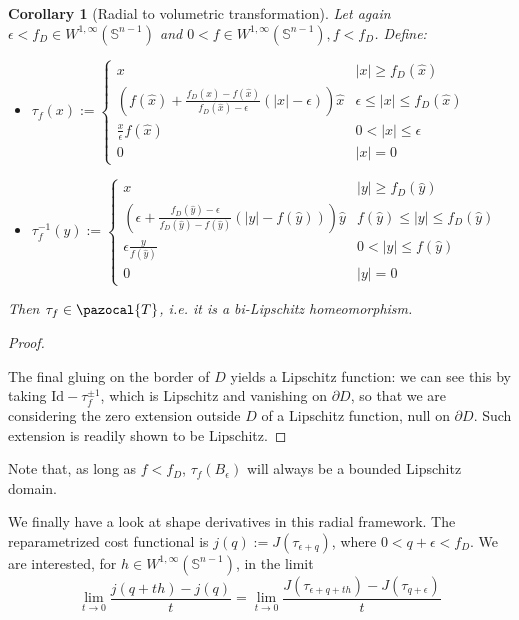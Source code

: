 \documentclass[english,a4paper,9pt,oneside]{scrbook}	%
\theoremstyle{break}
\newtheorem{cor}[equation]{Corollary}
\newenvironment{mproof}[1][\proofname]{%
  \begin{proof}[#1]$ $\par\nobreak\ignorespaces
}{%
  \end{proof}
}
\renewcommand*{\proofname}{Proof}
\theoremstyle{remark}
\newcommand{\mS}{\mathbb{S}^{n-1}}
\newcommand{\ds}{\displaystyle}
\newcommand{\cT}{\pazocal{T}}
\newcommand{\id}{\text{Id}}
\newcommand{\xh}{\hat{x}}
\newcommand{\yh}{\hat{y}}
\newcommand{\eps}{\epsilon}
\begin{document}
\begin{cor}[Radial to volumetric transformation]
\label{cor:star_shaped_transformation}
Let again $\eps <f_D \in W^{1,\infty}(\mS)$ and $0<f \in W^{1,\infty}(\mS), f<f_D$. Define:

\begin{itemize}
	\item $\ds \tau_f(x):=\left\{\begin{matrix}
 x & |x|\geq f_D(\xh)\\ 
 \left (  f(\xh)+\frac{f_D(\xh)-f(\xh)}{f_D(\xh)-\eps}(|x|-\eps) \right )\xh & \eps \leq |x| \leq f_D(\xh) \\ 
 \frac{x}{\epsilon}f(\hat{x}) & 0<|x|\leq \eps\\ 
 0 & |x|=0
\end{matrix}\right.$

	\item $\ds \tau_f^{-1}(y):=\left\{\begin{matrix}
 x & |y|\geq f_D(\yh)\\ 
 \left (  \eps+\frac{f_D(\yh)-\eps}{f_D(\yh)-f(\yh)}(|y|-f(\yh)) \right )\yh & f(\yh) \leq |y| \leq f_D(\yh) \\ 
 \epsilon \frac{y}{f(\hat{y})}& 0<|y|\leq f(\yh)\\ 
 0 & |y|=0
\end{matrix}\right.$
\end{itemize}


Then $\tau_f \in \cT$, i.e. it is a bi-Lipschitz homeomorphism.
\end{cor}
\begin{mproof}

The final gluing on the border of $D$ yields a Lipschitz function: we can see this by taking $\id -\tau_f^{\pm 1}$, which is Lipschitz and vanishing on $\partial D$, so that we are considering the zero extension outside $D$ of a Lipschitz function, null on $\partial D$. Such extension is readily shown to be Lipschitz.
\end{mproof}

Note that, as long as $f<f_D$, $\tau_f(B_\eps)$ will always be a bounded Lipschitz domain.

We finally have a look at shape derivatives in this radial framework. The reparametrized cost functional is $j(q):=J(\tau_{\eps+q})$, where $0<q+\eps < f_D$. We are interested, for $h\in W^{1, \infty}(\mS)$, in the limit $$\lim_{t\rightarrow 0}\frac{j(q+th)-j(q)}{t}=\lim_{t\rightarrow 0}\frac{J(\tau_{\eps+q+th})-J(\tau_{q+\eps})}{t}$$
\end{document}
